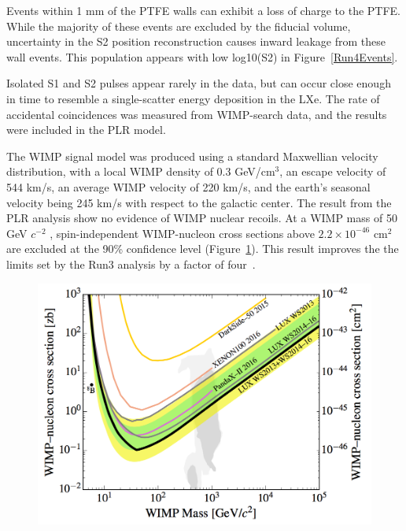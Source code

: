 Events within 1 mm of the PTFE walls can exhibit a loss of charge to the PTFE.  While the majority of these events are excluded by the fiducial volume, uncertainty in the S2 position reconstruction causes inward leakage from these wall events.  This population appears with low log10(S2) in Figure~\ref{Run4Events}.

 Isolated S1 and S2 pulses appear rarely in the data, but can occur close enough in time to resemble a single-scatter energy deposition in the LXe.  The rate of accidental coincidences was measured from WIMP-search data, and the results were included in the PLR model.

The WIMP signal model was produced using a standard Maxwellian velocity distribution, with a local WIMP density of 0.3 GeV/cm$^3$, an escape velocity of 544 km/s, an average WIMP velocity of 220 km/s, and the earth’s seasonal velocity being 245 km/s with respect to the galactic center.  The result from the PLR analysis show no evidence of WIMP nuclear recoils.  At a WIMP mass of 50  GeV $c^{-2}$ , spin-independent WIMP-nucleon cross sections above $2.2\times10^{-46}$ cm$^2$ are excluded at the 90\% confidence level (Figure~\ref{Run4Limit}).  This result improves the the limits set by the Run3 analysis by a factor of four~\cite{Akerib:2015rjg,Akerib:2016vxi}.

 \begin{figure} 
\includegraphics[scale=.4]{Run4Limit.png} 
\label{Run4Limit}
\end{figure}
